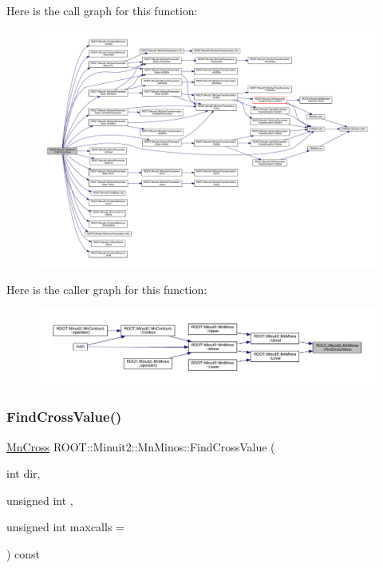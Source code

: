 Here is the call graph for this function\+:
\nopagebreak
\begin{figure}[H]
\begin{center}
\leavevmode
\includegraphics[width=350pt]{dc/d91/classROOT_1_1Minuit2_1_1MnMinos_a4b8df109769bd0bee2127da68615bb11_cgraph}
\end{center}
\end{figure}
Here is the caller graph for this function\+:
\nopagebreak
\begin{figure}[H]
\begin{center}
\leavevmode
\includegraphics[width=350pt]{dc/d91/classROOT_1_1Minuit2_1_1MnMinos_a4b8df109769bd0bee2127da68615bb11_icgraph}
\end{center}
\end{figure}
\mbox{\label{classROOT_1_1Minuit2_1_1MnMinos_a4b8df109769bd0bee2127da68615bb11}} 
\subsubsection{\texorpdfstring{FindCrossValue()}{FindCrossValue()}\hspace{0.1cm}{\footnotesize\ttfamily [2/3]}}
{\footnotesize\ttfamily \mbox{\hyperlink{classROOT_1_1Minuit2_1_1MnCross}{Mn\+Cross}} R\+O\+O\+T\+::\+Minuit2\+::\+Mn\+Minos\+::\+Find\+Cross\+Value (\begin{DoxyParamCaption}\item[{int}]{dir,  }\item[{unsigned int}]{,  }\item[{unsigned int}]{maxcalls = {} }\end{DoxyParamCaption}) const\hspace{0.3cm}{\ttfamily [protected]}}



